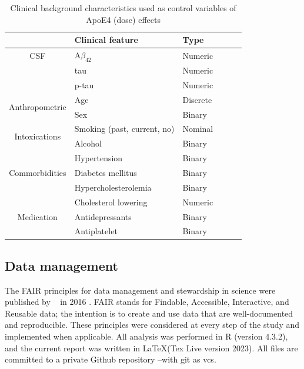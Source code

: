 \documentclass{amsart}
\begin{document}
\begin{table}[htb]
\caption{Clinical background characteristics used as control variables of ApoE4 (dose) effects}
\label{tab:clin}
\begin{tabular}{clllll} \toprule
                                & \textbf{Clinical feature}   & \textbf{Type} \\ \midrule
CSF                             & A$\beta_{42}$                 & Numeric       \\
                                & tau                         & Numeric       \\
                                & p-tau                       & Numeric       \\
\multirow{2}{*}{Anthropometric} & Age                         & Discrete      \\
                                & Sex                         & Binary        \\
\multirow{2}{*}{Intoxications}  & Smoking (past, current, no) & Nominal       \\
                                & Alcohol                     & Binary        \\
\multirow{3}{*}{Commorbidities} & Hypertension                & Binary        \\
                                & Diabetes mellitus           & Binary        \\
                                & Hypercholesterolemia        & Binary        \\
\multirow{3}{*}{Medication}     & Cholesterol lowering        & Numeric       \\
                                & Antidepressants             & Binary        \\
                                & Antiplatelet                & Binary        \\ \bottomrule
\end{tabular}
\end{table}

\subsection{Data management}
The FAIR principles for data management and stewardship in science were published by  ~\citeauthor{Wilkinson2016TheStewardship} in 2016 \cite{Wilkinson2016TheStewardship}. FAIR stands for Findable, Accessible, Interactive, and Reusable data; the intention is to create and use data that are well-documented and reproducible. These principles were considered at every step of the study and implemented when applicable. All analysis was performed in R (version 4.3.2), and the current report was written in \LaTeX (Tex Live version 2023). All files are committed to a private Github repository --with git as \acrfull{vcs}.
\end{document}
